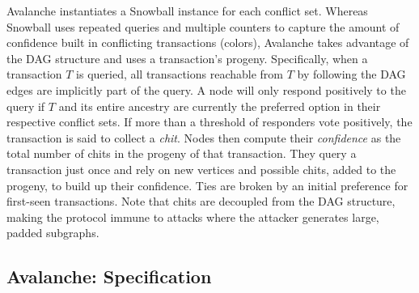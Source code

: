 %    

Avalanche instantiates a Snowball instance for each conflict set.
Whereas Snowball uses repeated queries and multiple counters to capture the amount of confidence built in conflicting transactions (colors),
Avalanche takes advantage of the DAG structure and uses a transaction's progeny.
Specifically, when a transaction $T$ is queried, all transactions reachable from $T$ by following the DAG edges are implicitly part of the query.
A node will only respond positively to the query if $T$ and its entire ancestry are currently the preferred option in their respective conflict sets.
If more than a threshold of responders vote positively, the transaction is said to collect a \emph{chit}.
Nodes then compute their \emph{confidence} as the total number of chits in the progeny of that transaction.
They query a transaction just once and rely on new vertices and possible chits, added to the progeny, to build up their confidence.
Ties are broken by an initial preference for first-seen transactions.
Note that chits are decoupled from the DAG structure, making the protocol immune to attacks where
the attacker generates large, padded subgraphs.

\subsection{Avalanche: Specification}%
\label{subsection:specification}

